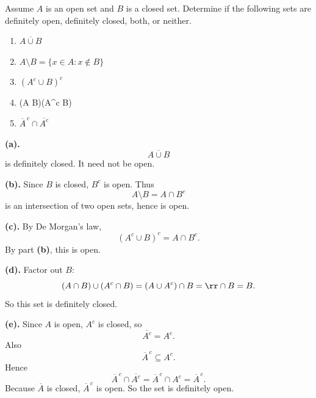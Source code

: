 \begin{problem}{
    Assume $A$ is an open set and $B$ is a closed set.
    Determine if the following sets are definitely open, definitely closed, both, or neither.
    \begin{enumerate}[label={(\alph*)}]
	\item $\overline{A\cup B}$
    \item $A\setminus B = \{x\in A : x\notin B\}$
    \item $(A^c\cup B)^c$
    \item (A \cap B)\cup(A^c \cap B)
    \item $\overline{A}^{\,c}\cap \overline{A^c}$
    \end{enumerate}
}
    \textbf{(a).}
    \[
        \overline{A\cup B}
    \]
    is definitely closed.
    It need not be open.

    \textbf{(b).}
    Since $B$ is closed, $B^c$ is open.
    Thus
    \[
        A\setminus B = A\cap B^c
    \]
    is an intersection of two open sets, hence is open.

    \textbf{(c).}
    By De Morgan's law,
    \[
        (A^c\cup B)^c = A\cap B^c.
    \]
    By part \textbf{(b)}, this is open.

    \textbf{(d).}
    Factor out $B$:
    \[
        (A\cap B)\cup(A^c\cap B) = (A\cup A^c)\cap B = \rr\cap B = B.
    \]
    So this set is definitely closed.

    \textbf{(e).}
    Since $A$ is open, $A^c$ is closed, so
    \[
        \overline{A^c}=A^c.
    \]
    Also
    \[
        \overline{A}^{\,c}\subseteq A^c.
    \]
    Hence
    \[
        \overline{A}^{\,c}\cap\overline{A^c}
        =
        \overline{A}^{\,c}\cap A^c
        =
        \overline{A}^{\,c}.
    \]
    Because $\overline{A}$ is closed, $\overline{A}^{\,c}$ is open.
    So the set is definitely open.
\end{problem}

